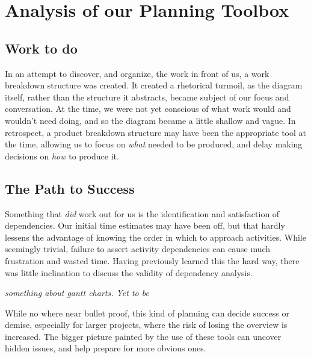 \section{Analysis of our Planning Toolbox}
\subsection{Work to do}
In an attempt to discover, and organize, the work in front of us, a work
breakdown structure was created. It created a rhetorical turmoil, as the diagram
itself, rather than the structure it abstracts, became subject of our focus and
conversation. At the time, we were not yet conscious of what work would
and wouldn't need doing, and so the diagram became a little shallow and vague.
In retrospect, a product breakdown structure may have been the appropriate tool
at the time, allowing us to focus on \emph{what} needed to be produced, and delay
making decisions on \emph{how} to produce it\cite{caye}.

\subsection{The Path to Success}
Something that \emph{did} work out for us is the identification and satisfaction of
dependencies. Our initial time estimates may have been off, but that hardly
lessens the advantage of knowing the order in which to approach activities.
While seemingly trivial, failure to assert activity dependencies can cause much
frustration and wasted time. Having previously learned this the hard way, there
was little inclination to discuss the validity of dependency analysis.

\emph{something about gantt charts. Yet to be}

While no where near bullet proof, this kind of planning can decide success or
demise\cite[chpt.~8]{caye}, especially for larger projects, where the risk of
losing the overview is increased. The bigger picture painted by the use of
these tools can uncover hidden issues, and help prepare for more obvious ones.
